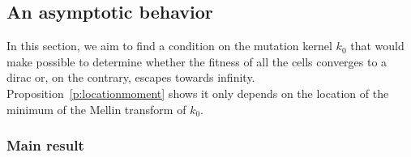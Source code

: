 \documentclass[11pt]{amsart}
\begin{document}
    \subsection{An asymptotic behavior}
    In this section, we aim to find a condition on the mutation kernel $k_0$ that would make possible to determine whether the fitness of all the cells converges to a dirac or, on the contrary, escapes towards infinity. Proposition~\ref{p:locationmoment} shows it only depends on the location of the minimum of the Mellin transform of $k_0$. 

        \subsubsection{Main result}
\end{document}
